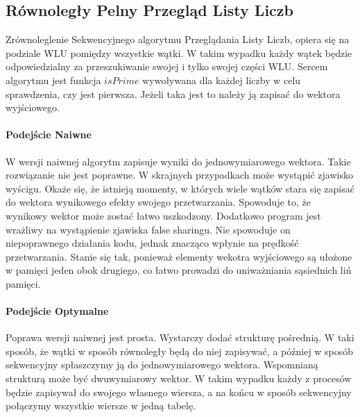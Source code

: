 \documentclass{article}
\begin{document}
            \subsection{Równoległy Pelny Przegląd Listy Liczb}
                Zrównoleglenie Sekwencyjnego algorytmu Przeglądania Listy Liczb, opiera się na podziale \gls{WLU} pomiędzy wszystkie wątki. W takim wypadku każdy wątek będzie odpowiedzialny za przeszukiwanie swojej i tylko swojej części \gls{WLU}. Sercem algorytmu jest funkcja $isPrime$ wywoływana dla każdej liczby w celu sprawdzenia, czy jest pierwsza. Jeżeli taka jest to należy ją zapisać do wektora wyjściowego.
                \paragraph{Podejście Naiwne}
                    W wersji naiwnej algorytm zapisuje wyniki do jednowymiarowego wektora. Takie rozwiązanie nie jest poprawne. W skrajnych przypadkach może wystąpić zjawisko wyścigu. Okaże się, że istnieją momenty, w których wiele wątków stara się zapisać do wektora wynikowego efekty swojego przetwarzania. Spowoduje to, że wynikowy wektor może zostać łatwo uszkodzony. Dodatkowo program jest wrażliwy na wystąpienie zjawiska false sharingu. Nie spowoduje on niepoprawnego działania kodu, jednak znacząco wpłynie na prędkość przetwarzania. Stanie się tak, ponieważ elementy wekotra wyjściowego są ułożone w pamięci jeden obok drugiego, co łatwo prowadzi do uniważniania sąsiednich liń pamięci. 
                
                \paragraph{Podejście Optymalne}
                    Poprawa wersji naiwnej jest prosta. Wystarczy dodać strukturę pośrednią. W taki sposób, że wątki w sposób równoległy będą do niej zapisywać, a później w sposób sekwencyjny spłaszczymy ją do jednowymiarowego wektora. Wspomnianą strukturą może być dwuwymiarowy wektor. W takim wypadku każdy z procesów będzie zapisywał do swojego własnego wiersza, a na końcu w sposób sekwencyjny połączymy wszystkie wiersze w jedną tabelę.
                    
\end{document}
